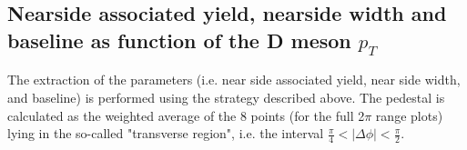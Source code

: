 \subsection{Nearside associated yield, nearside width and baseline as function of the D meson $p_{T}$}

The extraction of the parameters (i.e. near side associated yield, near side width, and baseline) is performed using the strategy described above. The pedestal is calculated as the weighted average of the 8 points (for the full 2$\pi$ range plots) lying in the so-called "transverse region", i.e. the interval $\frac{\pi}{4}<|\Delta\phi|<\frac{\pi}{2}$.

\begin{comment}
Figures (\ref{fig:dzerofinaldphifitted}), ( \ref{fig:dstarfinaldphifitted}) and ( \ref{fig:averagefinaldphifitted}) show the fitted correlation distributions of the $\Dzero$, $\Dstar$ and the average; the systematic boxes include only the uncorrelated systematics.


\begin{figure}
\centering
\caption{Final plot:  $\Dzero$ correlation, including only the uncorrelated systematics and the fitted function, with  $3 < D\ p_\text{T} < 5$ GeV/$c$, $5 < D\ p_\text{T} < 8$ GeV/$c$ and $8 < D\ p_\text{T} < 16$ GeV/$c$, while the associated tracks are selected with $p_{T}^{assoc}>0.3  GeV/c $.  }

\label{fig:dzerofinaldphifitted}
\end{figure}

\begin{figure}
\centering
\caption{Final plot:  $\Dstar$ correlation, including only the uncorrelated systematics and the fitted function, with  $3 < D\ p_\text{T} < 5$ GeV/$c$, $5 < D\ p_\text{T} < 8$ GeV/$c$ and $8 < D\ p_\text{T} < 16$ GeV/$c$, while the associated tracks are selected with $p_{T}^{assoc}>0.3  GeV/c $. The  plot with $3 < D\ p_\text{T} < 5$ GeV/c is not considered in the final plots, due to the discrepancy between $\Dzero$ and $\Dstar$ }


\end{comment}
